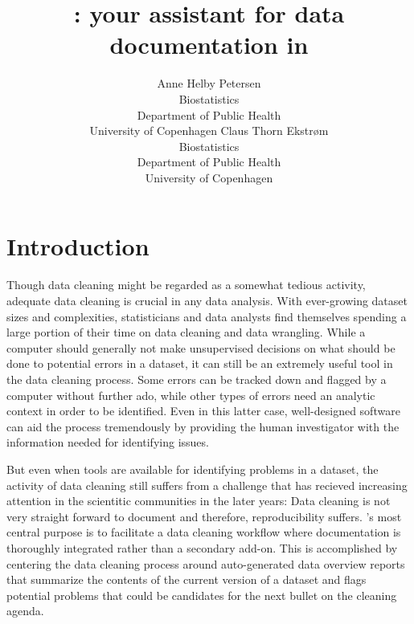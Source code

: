 \documentclass[article,shortnames]{jss}
\author{Anne Helby Petersen\\Biostatistics\\Department of Public
  Health\\University of Copenhagen \And Claus Thorn Ekstr\o m\\Biostatistics\\Department of Public
  Health\\University of Copenhagen}
\title{\pkg{dataMaid}: your assistant for data documentation in \proglang{R}}
\begin{document}
\section{Introduction}
Though data cleaning might be regarded as a somewhat tedious activity,
adequate data cleaning is crucial in any data analysis. With
ever-growing dataset sizes and complexities, statisticians and data
analysts find themselves spending a large portion of their time on
data cleaning and data wrangling. While a computer should generally not
make unsupervised decisions on what should be done to potential
errors in a dataset, it can still be an extremely useful tool in the
data cleaning process. Some errors can be tracked down and flagged by a
computer without further ado, while other types of errors need an analytic
context in order to be identified. Even in this latter case, well-designed
software can aid the process tremendously by providing the human
investigator with the information needed for identifying issues.

But even when tools are available for identifying problems in a dataset, the activity of data cleaning still suffers from a challenge that has recieved increasing attention in the scientitic communities in the later years: Data cleaning is not very straight forward to document and therefore, reproducibility suffers. 's most central purpose is to facilitate a data cleaning workflow where documentation is thoroughly integrated rather than a secondary add-on. This is accomplished by centering the data cleaning process around auto-generated data overview reports that summarize the contents of the current version of a dataset and flags potential problems that could be candidates for the next bullet on the cleaning agenda. 
\end{document}
